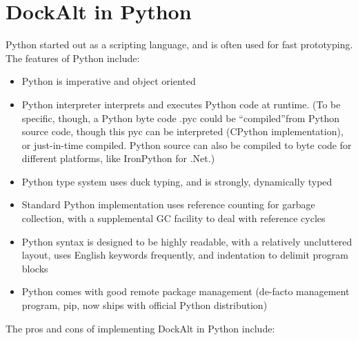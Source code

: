 \documentclass[letterpaper,twocolumn,10pt]{article}
\begin{document}
\section{DockAlt in Python}

Python started out as a scripting language, and is often used for fast prototyping. \cite{PythonWikipedia}The features of Python include:
\begin{itemize}
\item Python is imperative and object oriented
\item Python interpreter interprets and executes Python code at runtime. (To be specific, though, a Python byte code .pyc could be ``compiled''from Python source code, though this pyc can be interpreted (CPython implementation), or just-in-time compiled. Python source can also be compiled to byte code for different platforms, like IronPython for .Net.)
\item Python type system uses duck typing, and is strongly, dynamically typed \cite{PythonStronglyTyped}
\item Standard Python implementation uses reference counting for garbage collection, with a supplemental GC facility to deal with reference cycles
\item Python syntax is designed to be highly readable, with a relatively uncluttered layout, uses English keywords frequently, and indentation to delimit program blocks \cite{ZenPython}
\item Python comes with good remote package management (de-facto management program, pip, now ships with official Python distribution)
\end{itemize}
The pros and cons of implementing DockAlt in Python include: 
\end{document}
